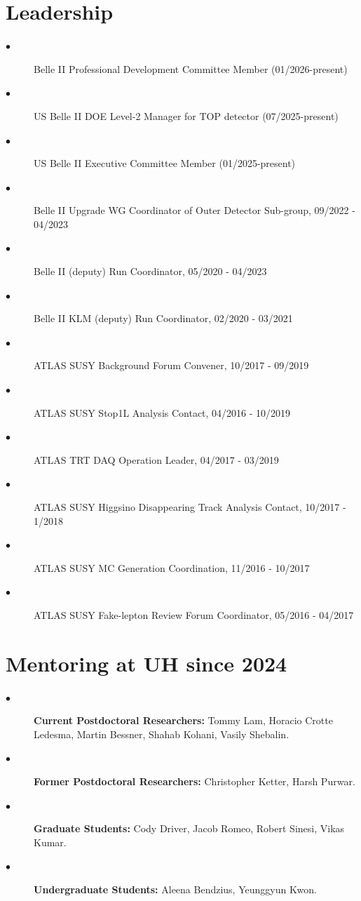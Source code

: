 \documentclass[11pt]{article}
\begin{document}
\vspace{-0.2in}
\section*{\large{Leadership}} 
{\footnotesize
\begin{description}
\item[$\bullet$]{Belle II Professional Development Committee Member (01/2026-present)}
\item[$\bullet$]{US Belle II DOE Level-2 Manager for TOP detector (07/2025-present)}
\item[$\bullet$]{US Belle II Executive Committee Member (01/2025-present)}
\item[$\bullet$]{Belle II Upgrade WG Coordinator of Outer Detector Sub-group, 09/2022 - 04/2023}
\item[$\bullet$]{Belle II (deputy) Run Coordinator, 05/2020 - 04/2023}
\item[$\bullet$]{Belle II KLM (deputy) Run Coordinator, 02/2020 - 03/2021}
\item[$\bullet$]{ATLAS SUSY Background Forum Convener, 10/2017 - 09/2019}
\item[$\bullet$]{ATLAS SUSY Stop1L Analysis Contact, 04/2016 - 10/2019} 
\item[$\bullet$]{ATLAS TRT DAQ Operation Leader, 04/2017 - 03/2019}
\item[$\bullet$]{ATLAS SUSY Higgsino Disappearing Track Analysis Contact, 10/2017 - 1/2018}
\item[$\bullet$]{ATLAS SUSY MC Generation Coordination, 11/2016 - 10/2017}
\item[$\bullet$]{ATLAS SUSY Fake-lepton Review Forum Coordinator, 05/2016 - 04/2017} \\
\end{description}
}

\vspace{-0.2in}
\section*{\large{Mentoring at UH since 2024}} 
{\footnotesize
\begin{description}
\item[$\bullet$]{\textbf{Current Postdoctoral Researchers:} Tommy Lam, Horacio Crotte Ledesma, Martin Bessner, Shahab Kohani, Vasily Shebalin.}
\item[$\bullet$]{\textbf{Former Postdoctoral Researchers:} Christopher Ketter, Harsh Purwar.}
\item[$\bullet$]{\textbf{Graduate Students:} Cody Driver, Jacob Romeo, Robert Sinesi, Vikas Kumar.}
\item[$\bullet$]{\textbf{Undergraduate Students:} Aleena Bendzius, Yeunggyun Kwon.}
\end{description}
}
\end{document}
